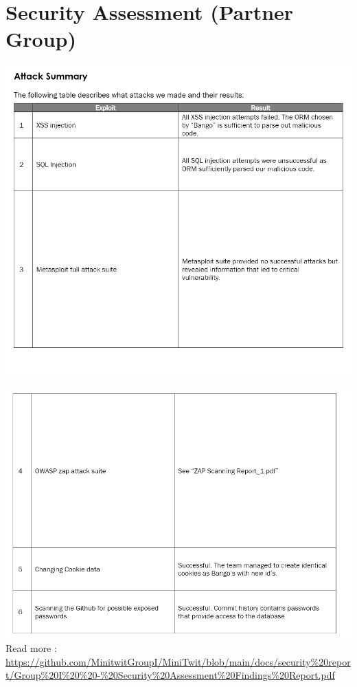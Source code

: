 \section{Security Assessment (Partner Group)}
\label{appendix:securityAssessment}

\includegraphics[width=1\textwidth]{images/Attack P1.png}

\includegraphics[width=1\textwidth]{images/Attack P2.png}
Read more :  \url{https://github.com/MinitwitGroupI/MiniTwit/blob/main/docs/security\%20report/Group\%20I\%20\%20-\%20Security\%20Assessment\%20Findings\%20Report.pdf}
